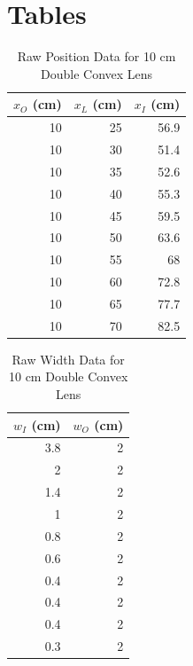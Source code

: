 \section{Tables}
\begin{table}[ht]
    \centering
    \begin{tabular}{|r|r|r|}
        \hline
        $x_{O}$ (cm) & $x_{L}$ (cm) & $x_{I}$ (cm) \\
        \hline
        10 & 25 & 56.9 \\
        10 & 30 & 51.4 \\
        10 & 35 & 52.6 \\
        10 & 40 & 55.3 \\
        10 & 45 & 59.5 \\
        10 & 50 & 63.6 \\
        10 & 55 & 68 \\
        10 & 60 & 72.8 \\
        10 & 65 & 77.7 \\
        10 & 70 & 82.5 \\
        \hline
        \end{tabular}
    \caption{Raw Position Data for 10 cm Double Convex Lens}
    \label{table.08.position.10cm}
\end{table}
\begin{table}[ht]
    \centering
    \begin{tabular}{|r|r|}
        \hline
        $w_{I}$ (cm) & $w_{O}$ (cm) \\
        \hline
        3.8 & 2 \\
        2 & 2 \\
        1.4 & 2 \\
        1 & 2 \\
        0.8 & 2 \\
        0.6 & 2 \\
        0.4 & 2 \\
        0.4 & 2 \\
        0.4 & 2 \\
        0.3 & 2 \\
        \hline
    \end{tabular}
    \caption{Raw Width Data for 10 cm Double Convex Lens}
    \label{table.08.width.10cm}
\end{table}
